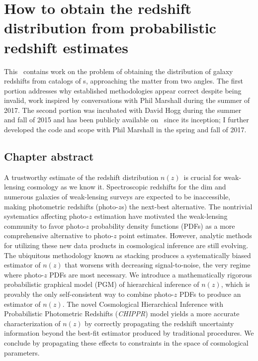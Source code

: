 \renewcommand{\chapid}{chippr}

\newcommand{\Chippr}{\textit{CHIPPR}}
\newcommand{\cosmolike}{\repo{CosmoLike}}

\newcommand{\pzip}{\pz\ implicit posterior}
\newcommand{\nz}{$n(z)$}
\newcommand{\Nz}{$N(z)$}
\newcommand{\stack}{$\hat{N}(z)$}
\newcommand{\ndphi}{\ensuremath{\vec{\phi}}}%
\newcommand{\data}{\ensuremath{\vec{d}}}%

\chapter{How to obtain the redshift distribution from probabilistic redshift estimates}

This \paper\ contains work on the problem of obtaining the distribution of galaxy redshifts from catalogs of \pzpdf s, approaching the matter from two angles.
The first portion addresses why established methodologies appear correct despite being invalid, work inspired by conversations with Phil Marshall during the summer of 2017.
The second portion was incubated with David Hogg during the summer and fall of 2015 and has been publicly available on \github\ since its inception; I further developed the code and scope with Phil Marshall in the spring and fall of 2017.

\section{Chapter abstract}

A trustworthy estimate of the redshift distribution \nz\ is crucial for weak-lensing cosmology as we know it.
Spectroscopic redshifts for the dim and numerous galaxies of weak-lensing surveys are expected to be inaccessible, making photometric redshifts (photo-$z$s) the next-best alternative.
The nontrivial systematics affecting photo-$z$ estimation have motivated the weak-lensing community to favor photo-$z$ probability density functions (PDFs) as a more comprehensive alternative to photo-$z$ point estimates.
However, analytic methods for utilizing these new data products in cosmological inference are still evolving.
The ubiquitous methodology known as stacking produces a systematically biased estimator of $n(z)$ that worsens with decreasing signal-to-noise, the very regime where photo-$z$ PDFs are most necessary.
We introduce a mathematically rigorous probabilistic graphical model (PGM) of hierarchical inference of $n(z)$, which is provably the only self-consistent way to combine photo-$z$ PDFs to produce an estimator of $n(z)$.
The novel Cosmological Hierarchical Inference with Probabilistic Photometric Redshifts (\Chippr) model yields a more accurate characterization of $n(z)$ by correctly propagating the redshift uncertainty information beyond the best-fit estimator produced by traditional procedures.
We conclude by propagating these effects to constraints in the space of cosmological parameters.

